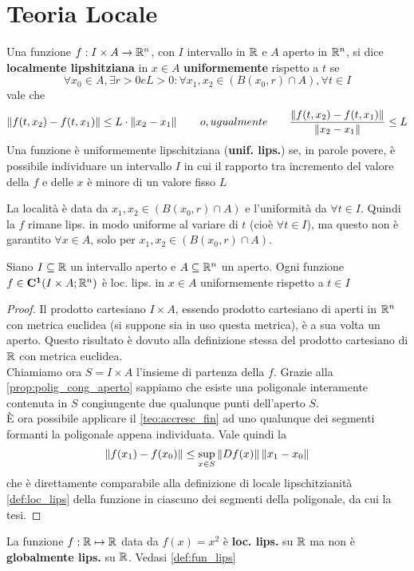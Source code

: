 \section{Teoria Locale}
\begin{definition}
	\label{def:loc_lips}
	Una funzione $f:I\times A\to \mathbb{R}^n$, con $I$ intervallo in $\mathbb{R}$ e $A$ aperto in $\mathbb{R}^n$, si dice \textbf{localmente lipshitziana} in $x\in A$ \textbf{uniformemente} rispetto a $t$ se
	$$\forall x_0 \in A, \exists r>0 e L>0: \forall x_1,x_2 \in (B(x_0,r)\cap A), \forall t\in I$$
	vale che
	$$\left\|f(t,x_2)-f(t,x_1)\right\|\leq L\cdot\left\|x_2-x_1\right\|\qquad o, ugualmente\qquad\frac{\left\|f(t,x_2)-f(t,x_1)\right\|}{\left\|x_2-x_1\right\|}\leq L$$
	Una funzione è uniformemente lipschitziana (\textbf{unif. lips.}) se, in parole povere, è possibile individuare un intervallo $I$ in cui il rapporto tra incremento del valore della $f$ e delle $x$ è minore di un valore fisso $L$ 
\end{definition}
\begin{note}
	La località è data da $x_1,x_2 \in (B(x_0,r)\cap A)$ e l'uniformità da $\forall t\in I$. Quindi la $f$ rimane lips. in modo uniforme al variare di $t$ (cioè $\forall t\in I$), ma questo non è garantito $\forall x\in A$, solo per $x_1,x_2 \in (B(x_0,r)\cap A)$.
\end{note}
\begin{proposition}
	\label{prop:fc1_loc_lips}
	Siano $I\subseteq \mathbb{R}$ un intervallo aperto e $A\subseteq \mathbb{R}^n$ un aperto. Ogni funzione $f\in\mathbf{C^{1}}(I\times A;\mathbb{R}^n)$ è loc. lips. in $x\in A$ uniformemente rispetto a $t\in I$
	\begin{proof}
		Il prodotto cartesiano $I\times A$, essendo prodotto cartesiano di aperti in $\mathbb{R}^n$ con metrica euclidea (si suppone sia in uso questa metrica), è a sua volta un aperto. Questo risultato è dovuto alla definizione stessa del prodotto cartesiano di $\mathbb{R}$ con metrica euclidea.\\
		Chiamiamo ora $S=I\times A$ l'insieme di partenza della $f$. Grazie alla \ref{prop:polig_cong_aperto} sappiamo che esiste una poligonale interamente contenuta in $S$ congiungente due qualunque punti dell'aperto $S$.\\
		È ora possibile applicare il \ref{teo:accresc_fin} ad uno qualunque dei segmenti formanti la poligonale appena individuata. Vale quindi la
		$$\left\|f(x_1)-f(x_0)\right\|\le \sup\limits_{x\in S}\left\|Df(x)\right\|\left\|x_1-x_0\right\|$$
		che è direttamente comparabile alla definizione di locale lipschitzianità \ref{def:loc_lips} della funzione in ciascuno dei segmenti della poligonale, da cui la tesi.
	\end{proof}
\end{proposition}
\begin{example}
	La funzione $f:\mathbb{R}\mapsto\mathbb{R}$ data da $f(x)=x^2$ è \textbf{loc. lips.} su $\mathbb{R}$ ma non è \textbf{globalmente lips.} su $\mathbb{R}$. Vedasi \ref{def:fun_lips}
\end{example}

